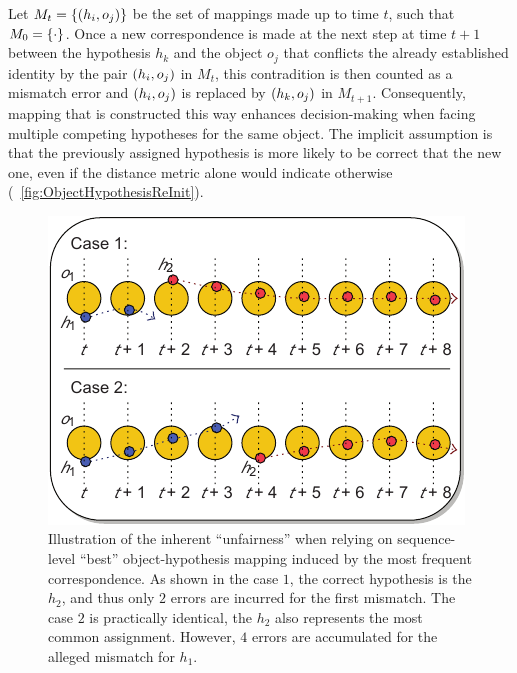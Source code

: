 Let $M_t = \left\{ {\left( {h_i, o_j} \right)} \right\}$ be the set of mappings made up to time $t$, such that $M_0 = \left\{ {\cdot} \right\}$. Once a new correspondence is made at the next step at time $t + 1$ between the hypothesis $h_k$ and the object $o_j$ that conflicts the already established identity by the pair $\left( {h_i, o_j} \right)$ in $M_t$, this contradition is then counted as a mismatch error and $\left( {h_i, o_j} \right)$ is replaced by $\left( {h_k, o_j} \right)$ in $M_{t + 1}$. Consequently, mapping that is constructed this way enhances decision-making when facing multiple competing hypotheses for the same object. The implicit assumption is that the previously assigned hypothesis is more likely to be correct that the new one, even if the distance metric alone would indicate otherwise (\figtext{}~\ref{fig:ObjectHypothesisReInit}).

\begin{figure}[t]
    \centerline{\includegraphics[width=0.5\linewidth]{figures/theoretical_foundations/seq_based_correspondence_issues.pdf}}
    \caption[Sequence-based correspondence mismatches]{Illustration of the inherent ``unfairness'' when relying on sequence-level ``best'' object-hypothesis mapping induced by the most frequent correspondence. As shown in the case $1$, the correct hypothesis is the $h_2$, and thus only $2$ errors are incurred for the first mismatch. The case $2$ is practically identical, the $h_2$ also represents the most common assignment. However, $4$ errors are accumulated for the alleged mismatch for $h_1$. }
    \label{fig:SeqLevelMostCommonCorrespondenceProb}
\end{figure}

